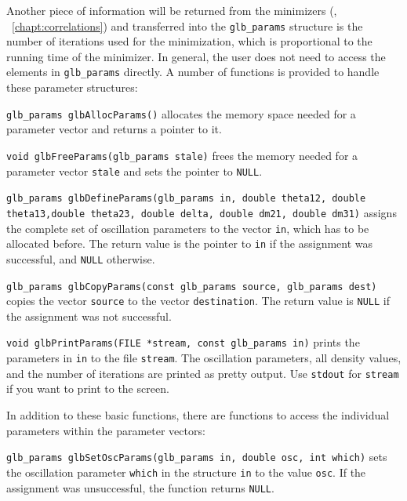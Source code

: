 Another piece of information will be returned from the minimizers 
(\cf, \Chapt~\ref{chapt:correlations}) and transferred
into the {\tt glb\_params} structure is the number
of iterations used for the minimization, which is proportional to the
running time of the minimizer. In general, the user does not need to
access the elements in {\tt glb\_params} directly. A number of functions
is provided to handle these parameter structures:
\begin{function}
{\tt glb\_params glbAllocParams()} allocates the memory space
needed for a parameter vector and returns a pointer to it.
\end{function}
\begin{function}
{\tt void glbFreeParams(glb\_params stale)} frees the memory
needed for a parameter vector {\tt stale} and sets the pointer to {\tt NULL}.
\end{function}
\begin{function}
{\tt glb\_params glbDefineParams(glb\_params in, double theta12, double theta13,double theta23, double delta, double dm21, double dm31)} assigns
the complete set of oscillation parameters to the vector {\tt in}, which has
to be allocated before. The return value is the pointer to {\tt in} if 
the assignment was successful, and {\tt NULL} otherwise.
\end{function}
\begin{function}
 {\tt glb\_params glbCopyParams(const glb\_params source, glb\_params dest)}
 copies the vector {\tt source} to the vector {\tt destination}. The return
 value is {\tt NULL} if the assignment was not successful.
\end{function}
\begin{function}
{\tt void glbPrintParams(FILE *stream, const glb\_params in)} prints the
parameters in {\tt in} to the file {\tt stream}. The oscillation
parameters, all density values, and the number of iterations are
printed as pretty output. Use {\tt stdout} for {\tt stream} if you want
to print to the screen.
\end{function}
In addition to these basic functions, there are functions to access
the individual parameters within the parameter vectors:
\begin{function}
{\tt glb\_params glbSetOscParams(glb\_params in, double osc, int which)}
sets the oscillation parameter {\tt which} in the structure {\tt in}
to the value {\tt osc}. If the assignment was unsuccessful, the 
function returns {\tt NULL}.
\end{function}
